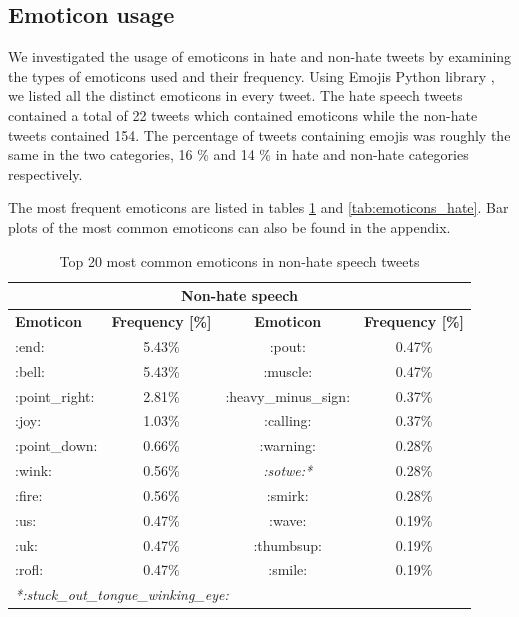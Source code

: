 \documentclass[conference]{IEEEtran}
\begin{document}
\subsection{Emoticon usage}
We investigated the usage of emoticons in hate and non-hate tweets by examining the types 
of emoticons used and their frequency.  Using Emojis Python library \cite{python:emojis}, we 
listed all the distinct emoticons in every tweet. The hate speech tweets contained a total of 22 tweets which contained emoticons
while the  non-hate tweets contained 154. The percentage of tweets containing emojis was 
roughly the same in the two categories, 16 \% and 14 \% in hate and non-hate categories respectively.

The most frequent emoticons are listed in tables \ref{tab:emoticons_non_hate} and \ref{tab:emoticons_hate}. 
Bar plots of the most common emoticons can also be found in the appendix.


\begin{table}[!ht]
    \def\arraystretch{1.2}%
    \begin{center}
      \caption{Top 20 most common emoticons in non-hate speech tweets}
      \label{tab:emoticons_non_hate}
      \begin{tabular}{l c | c c}
        \hline\hline
        \multicolumn{4}{c}{\textbf{Non-hate speech}}\\
        \hline
        \textbf{Emoticon}&\textbf{Frequency [\%]}&\textbf{Emoticon}&\textbf{Frequency [\%]}\\
        \hline
        :end: & 5.43\% & :pout: & 0.47\%\\
        :bell: & 5.43\% & :muscle: & 0.47\%\\
        :point\_right: & 2.81\% & :heavy\_minus\_sign: & 0.37\%\\
        :joy: & 1.03\% & :calling: & 0.37\%\\
        :point\_down: & 0.66\% & :warning: & 0.28\%\\
        :wink: & 0.56\% & \emph{:sotwe:*} & 0.28\%\\
        :fire: & 0.56\% & :smirk: & 0.28\%\\
        :us: & 0.47\% & :wave: & 0.19\%\\
        :uk: & 0.47\% & :thumbsup: & 0.19\%\\
        :rofl: & 0.47\% & :smile: & 0.19\%\\                           
        \hline
        \multicolumn{4}{l}{\emph{*:stuck\_out\_tongue\_winking\_eye:}}\\
        \hline\hline
      \end{tabular}  
    \end{center}
  \end{table}
\end{document}
